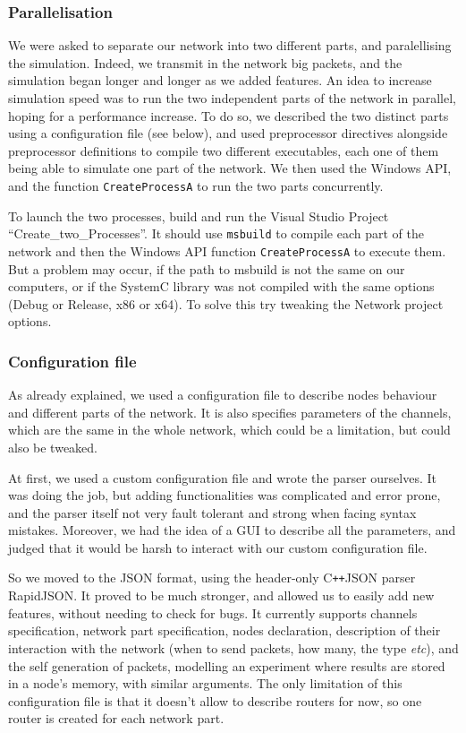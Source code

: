 \documentclass[12pt,a4paper]{article}
\newcommand{\Cpp}{C\texttt{++}}
\begin{document}
\subsubsection*{Parallelisation}
We were asked to separate our network into two different parts, and paralellising the simulation. Indeed, we transmit in the network big packets, and the simulation began longer and longer as we added features. An idea to increase simulation speed was to run the two independent parts of the network in parallel, hoping for a performance increase. To do so, we described the two distinct parts using a configuration file (see below), and used preprocessor directives alongside preprocessor definitions to compile two different executables, each one of them being able to simulate one part of the network. We then used the Windows API, and the function \texttt{CreateProcessA} to run the two parts concurrently.

To launch the two processes, build and run the Visual Studio Project ``Create\_two\_Processes''. It should use \texttt{msbuild} to compile each part of the network and then the Windows API function \texttt{CreateProcessA} to execute them. But a problem may occur, if the path to msbuild is not the same on our computers, or if the SystemC library was not compiled with the same options (Debug or Release, x86 or x64). To solve this try tweaking the Network project options.
\subsubsection*{Configuration file}
As already explained, we used a configuration file to describe nodes behaviour and different parts of the network. It is also specifies parameters of the channels, which are the same in the whole network, which could be a limitation, but could also be tweaked.

At first, we used a custom configuration file and wrote the parser ourselves. It was doing the job, but adding functionalities was complicated and error prone, and the parser itself not very fault tolerant and strong when facing syntax mistakes. Moreover, we had the idea of a GUI to describe all the parameters, and judged that it would be harsh to interact with our custom configuration file.

So we moved to the JSON format, using the header-only \Cpp JSON parser RapidJSON. It proved to be much stronger, and allowed us to easily add new features, without needing to check for bugs. It currently supports channels specification, network part specification, nodes declaration, description of their interaction with the network (when to send packets, how many, the type \textsl{etc}), and the self generation of packets, modelling an experiment where results are stored in a node's memory, with similar arguments. The only limitation of this configuration file is that it doesn't allow to describe routers for now, so one router is created for each network part. 
\end{document}
